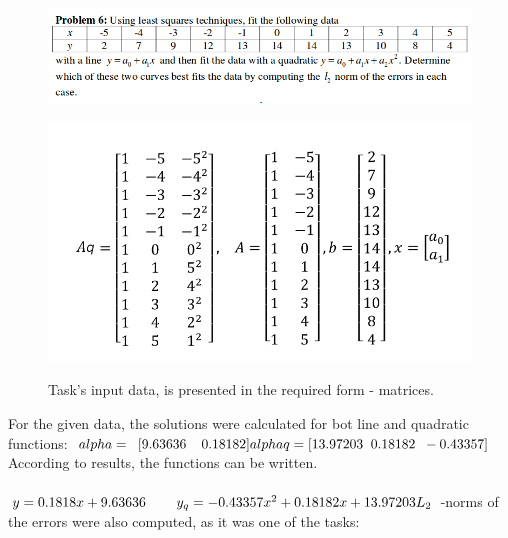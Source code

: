 \documentclass[eng,openany]{mgr}
\begin{document}
\begin{figure}[h]
\centering
\includegraphics[width=0.7\linewidth]{screenshot017}
\label{fig:screenshot017}
\end{figure}

\begin{figure}[h]
\centering
\includegraphics[width=0.4\linewidth]{screenshot018}
\label{fig:screenshot018}
\caption{Task's input data, is presented in the required form - matrices.}
\end{figure}

For the given data, the solutions were calculated for bot line and quadratic functions:
\begin{math}
alpha = \;\;[9.63636 \;\;\;\;0.18182]\\
alphaq = [13.97203 \;\;0.18182 \;\;-0.43357]\\\\
\end{math}
According to results, the functions can be written.\\\\
\begin{math}
y = 0.1818 x + 9.63636 \;\;\;\;\;\;\;\;y_q = -0.43357x^2 + 0.18182x + 13.97203\\\\
L_2
\end{math}
-norms of the errors were also computed, as it was one of the tasks:
\end{document}

